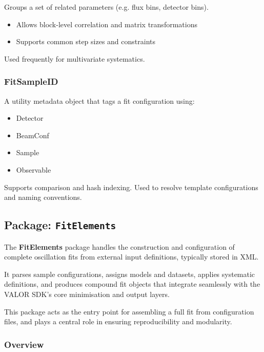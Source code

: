 Groups a set of related parameters (e.g. flux bins, detector bins).

\begin{itemize}
  \item Allows block-level correlation and matrix transformations
  \item Supports common step sizes and constraints
\end{itemize}

Used frequently for multivariate systematics.

\vspace{1em}
\subsubsection*{\color{cadmiumgreen}\bf FitSampleID}

A utility metadata object that tags a fit configuration using:

\begin{itemize}
  \item {\color{amber}Detector}
  \item {\color{amber}BeamConf}
  \item {\color{amber}Sample}
  \item {\color{amber}Observable}
\end{itemize}

Supports comparison and hash indexing. Used to resolve template configurations and naming conventions.

%
%
%

\subsection{Package: \texttt{FitElements}}

The {\color{cadmiumgreen} \textbf{FitElements}} package handles the construction and configuration of complete oscillation fits from external input definitions, typically stored in XML.

It parses sample configurations, assigns models and datasets, applies systematic definitions, and produces compound fit objects that integrate seamlessly with the VALOR SDK’s core minimisation and output layers.

This package acts as the entry point for assembling a full fit from configuration files, and plays a central role in ensuring reproducibility and modularity.

\vspace{1em}
\subsubsection*{Overview}

